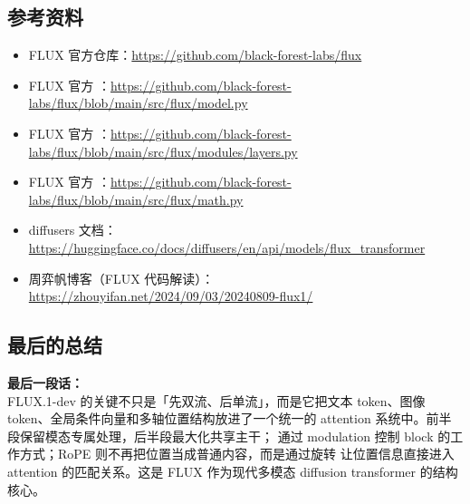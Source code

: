 \subsection{参考资料}

\begin{itemize}[leftmargin=1.5em]
  \item FLUX 官方仓库：\url{https://github.com/black-forest-labs/flux}
  \item FLUX 官方 ：\url{https://github.com/black-forest-labs/flux/blob/main/src/flux/model.py}
  \item FLUX 官方 ：\url{https://github.com/black-forest-labs/flux/blob/main/src/flux/modules/layers.py}
  \item FLUX 官方 ：\url{https://github.com/black-forest-labs/flux/blob/main/src/flux/math.py}
  \item diffusers 文档：\url{https://huggingface.co/docs/diffusers/en/api/models/flux_transformer}
  \item 周弈帆博客（FLUX 代码解读）：\url{https://zhouyifan.net/2024/09/03/20240809-flux1/}
\end{itemize}

\subsection{最后的总结}

\begin{conceptbox}
\textbf{最后一段话：}\\
FLUX.1-dev 的关键不只是「先双流、后单流」，而是它把文本 token、图像 token、全局条件向量和多轴位置结构放进了一个统一的 attention 系统中。前半段保留模态专属处理，后半段最大化共享主干； 通过 modulation 控制 block 的工作方式；RoPE 则不再把位置当成普通内容，而是通过旋转  让位置信息直接进入 attention 的匹配关系。这是 FLUX 作为现代多模态 diffusion transformer 的结构核心。
\end{conceptbox}
